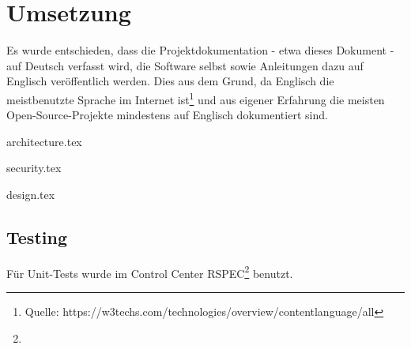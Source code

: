 \begin{comment}
(Implementierung) Architektur und Design beschrieben: Mit begründeten Architekturentscheidungen, mit Diskussion, wie Qualitätsattribute sichergestellt wurden (welche Qualität wurde erreicht?), mit Dokumentation, welche Experimente/Tests durchgeführt wurden und welche Lösungsoptionen aufgrund der Ergebnisse dieser Experimente/Tests
verworfen wurden (was ging schief?)
\end{comment}

\chapter{Umsetzung}

Es wurde entschieden, dass die Projektdokumentation - etwa dieses Dokument - auf Deutsch verfasst wird, die Software selbst sowie Anleitungen dazu auf Englisch veröffentlich werden. Dies aus dem Grund, da Englisch die meistbenutzte Sprache im Internet ist\footnote{Quelle: https://w3techs.com/technologies/overview/content\textunderscore language/all} und aus eigener Erfahrung die meisten Open-Source-Projekte mindestens auf Englisch dokumentiert sind.

\xxx


{architecture.tex}

\clearpage
{security.tex}

\clearpage
{design.tex}

\clearpage
\section{Testing}


Für Unit-Tests wurde im Control Center RSPEC\footnote{} benutzt.